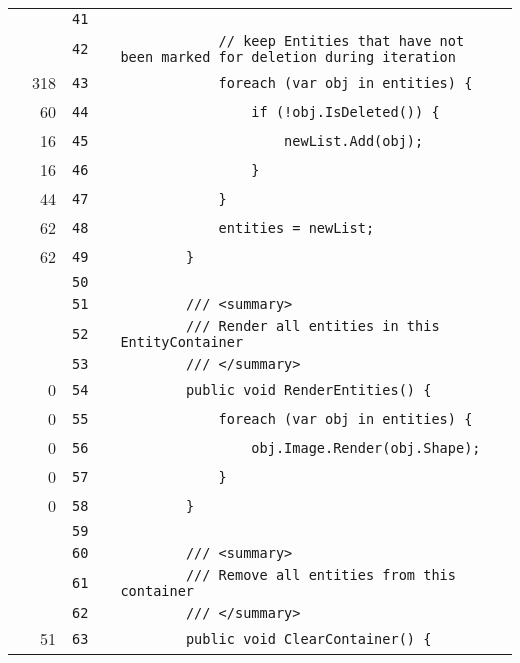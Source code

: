 \documentclass[a4paper,landscape,10pt]{article}
\begin{document}
\begin{longtable}[l]{lrrll}
\cellcolor{gray} &  & \verb~41~ & & \verb~~\\
\cellcolor{gray} &  & \verb~42~ & & \verb~            // keep Entities that have not been marked for deletion during iteration~\\
\cellcolor{green} & 318 & \verb~43~ & & \verb~            foreach (var obj in entities) {~\\
\cellcolor{green} & 60 & \verb~44~ & & \verb~                if (!obj.IsDeleted()) {~\\
\cellcolor{green} & 16 & \verb~45~ & & \verb~                    newList.Add(obj);~\\
\cellcolor{green} & 16 & \verb~46~ & & \verb~                }~\\
\cellcolor{green} & 44 & \verb~47~ & & \verb~            }~\\
\cellcolor{green} & 62 & \verb~48~ & & \verb~            entities = newList;~\\
\cellcolor{green} & 62 & \verb~49~ & & \verb~        }~\\
\cellcolor{gray} &  & \verb~50~ & & \verb~~\\
\cellcolor{gray} &  & \verb~51~ & & \verb~        /// <summary>~\\
\cellcolor{gray} &  & \verb~52~ & & \verb~        /// Render all entities in this EntityContainer~\\
\cellcolor{gray} &  & \verb~53~ & & \verb~        /// </summary>~\\
\cellcolor{red} & 0 & \verb~54~ & & \verb~        public void RenderEntities() {~\\
\cellcolor{red} & 0 & \verb~55~ & & \verb~            foreach (var obj in entities) {~\\
\cellcolor{red} & 0 & \verb~56~ & & \verb~                obj.Image.Render(obj.Shape);~\\
\cellcolor{red} & 0 & \verb~57~ & & \verb~            }~\\
\cellcolor{red} & 0 & \verb~58~ & & \verb~        }~\\
\cellcolor{gray} &  & \verb~59~ & & \verb~~\\
\cellcolor{gray} &  & \verb~60~ & & \verb~        /// <summary>~\\
\cellcolor{gray} &  & \verb~61~ & & \verb~        /// Remove all entities from this container~\\
\cellcolor{gray} &  & \verb~62~ & & \verb~        /// </summary>~\\
\cellcolor{green} & 51 & \verb~63~ & & \verb~        public void ClearContainer() {~\\

\end{longtable}
\end{document}
